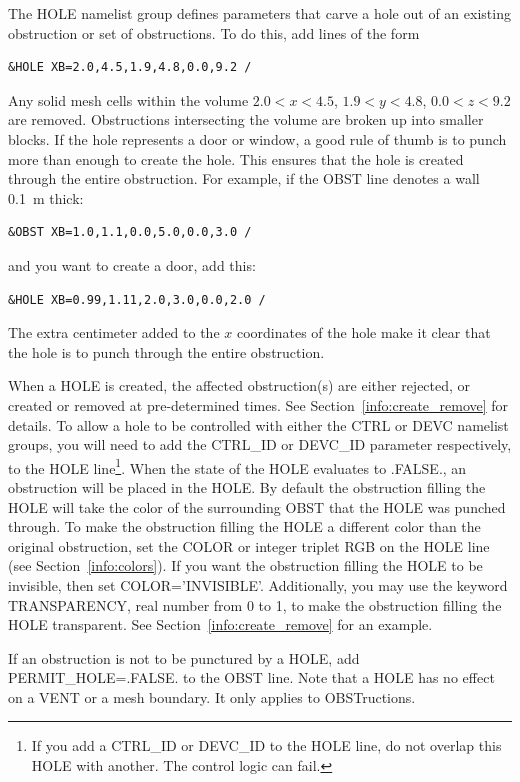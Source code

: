 \documentclass[11pt]{book}
\begin{document}
The {\ct HOLE} namelist group defines parameters that carve a hole out of an existing obstruction or set of obstructions. To do this, add lines of the form
\begin{lstlisting}
&HOLE XB=2.0,4.5,1.9,4.8,0.0,9.2 /
\end{lstlisting}
Any solid mesh cells within the volume $2.0<x<4.5$, $1.9<y<4.8$, $0.0<z<9.2$ are removed. Obstructions intersecting the volume are broken up into smaller blocks. If the hole represents a door or window, a good rule of thumb is to punch more than enough to create the hole. This ensures that the hole is created through the entire obstruction. For example, if the {\ct OBST} line denotes a wall 0.1~m thick:
\begin{lstlisting}
&OBST XB=1.0,1.1,0.0,5.0,0.0,3.0 /
\end{lstlisting}
and you want to create a door, add this:
\begin{lstlisting}
&HOLE XB=0.99,1.11,2.0,3.0,0.0,2.0 /
\end{lstlisting}
The extra centimeter added to the $x$ coordinates of the hole make it clear that the hole is to punch through the entire obstruction.

When a {\ct HOLE} is created, the affected obstruction(s) are either rejected, or created or removed at pre-determined times. See Section~\ref{info:create_remove} for details. To allow a hole to be controlled with either the {\ct CTRL} or {\ct DEVC} namelist groups, you will need to add the {\ct CTRL\_ID} or {\ct DEVC\_ID} parameter respectively, to the {\ct HOLE} line\footnote{If you add a {\ct CTRL\_ID} or {\ct DEVC\_ID} to the {\ct HOLE} line, do not overlap this {\ct HOLE} with another. The control logic can fail.}.   When the state of the {\ct HOLE} evaluates to {\ct .FALSE.}, an obstruction will be placed in the {\ct HOLE}.  By default the obstruction filling the {\ct HOLE} will take the color of the surrounding {\ct OBST} that the {\ct HOLE} was punched through.  To make the obstruction filling the {\ct HOLE} a different color than the original obstruction, set the {\ct COLOR} or integer triplet {\ct RGB} on the {\ct HOLE} line (see Section~\ref{info:colors}). If you want the obstruction filling the {\ct HOLE} to be invisible, then set {\ct COLOR='INVISIBLE'}.  Additionally, you may use the keyword {\ct TRANSPARENCY}, real number from 0 to 1, to make the obstruction filling the {\ct HOLE} transparent. See Section~\ref{info:create_remove} for an example.

If an obstruction is not to be punctured by a {\ct HOLE}, add {\ct PERMIT\_HOLE=.FALSE.} to the {\ct OBST} line. Note that a {\ct HOLE} has no effect on a {\ct VENT} or a mesh boundary. It only applies to {\ct OBST}ructions.
\end{document}
